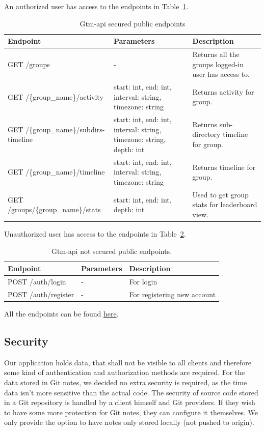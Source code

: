 An authorized user has access to the endpoints in Table~\ref{tab:gtm-api-endpoints-secured}.
\begin{table}[H]
    \centering
    \begin{tabular}{ | p{5cm} | p{4cm} | p{5cm} |}
        \hline
        \textbf{Endpoint} & \textbf{Parameters} & \textbf{Description}\\
        \hline
        GET /groups & - & Returns all the groups logged-in user has access to. \\
        \hline
        GET /\{group\_name\}/activity & start: int, end: int, interval: string, timezone: string & Returns activity for group. \\
        \hline
        GET /\{group\_name\}/subdirs-timeline & start: int, end: int, interval: string, timezone: string, depth: int & Returns sub-directory timeline for group. \\
        \hline
        GET /\{group\_name\}/timeline & start: int, end: int, interval: string, timezone: string & Returns timeline for group. \\
        \hline
        GET /groups/\{group\_name\}/stats & start: int, end: int, depth: int & Used to get group stats for leaderboard view.\\
        \hline
    \end{tabular}
    \caption{Gtm-api secured public endpoints}
    \label{tab:gtm-api-endpoints-secured}
\end{table}

Unauthorized user has access to the endpoints in Table~\ref{tab:gtm-api-endpoints-public}.
\begin{table}[H]
    \centering
    \begin{tabular}{ | p{5cm} | p{4cm} | p{5cm} |}
        \hline
        \textbf{Endpoint} & \textbf{Parameters} & \textbf{Description}\\
        \hline
        POST /auth/login & - & For login \\
        \hline
        POST /auth/register & - & For registering new account \\
        \hline
    \end{tabular}
    \caption{Gtm-api not secured public endpoints.}
    \label{tab:gtm-api-endpoints-public}
\end{table}

All the endpoints can be found \href{https://cs.ttu.ee/services/gtm/api/swagger/index.html}{here}.

\subsection{Security}\label{subsec:scurity}
Our application holds data, that shall not be visible to all clients and therefore some kind of authentication and authorization methods are required.
For the data stored in Git notes, we decided no extra security is required, as the time data isn't more sensitive than the actual code.
The security of source code stored in a Git repository is handled by a client himself and Git providers.
If they wish to have some more protection for Git notes, they can configure it themselves.
We only provide the option to have notes only stored locally (not pushed to origin).

